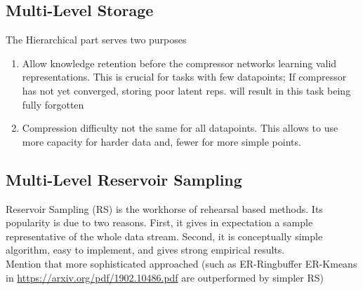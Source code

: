 \documentclass[colorinlistoftodos]{article} %
\begin{document}
    

    
    

\subsection{Multi-Level Storage}
The Hierarchical part  serves two purposes
\begin{enumerate}
    \item Allow knowledge retention before the compressor networks learning valid representations. This is crucial for tasks with few datapoints; If compressor has not yet converged, storing poor latent reps. will result in this task being fully forgotten
    \item Compression difficulty not the same for all datapoints. This allows to use more capacity for harder data and, fewer for more simple points.
\end{enumerate}

\subsection{Multi-Level Reservoir Sampling}
Reservoir Sampling (RS) is the workhorse of rehearsal based methods. Its popularity is due to two reasons. First, it gives in expectation a sample representative of the whole data stream.  Second, it is conceptually simple algorithm, easy to implement, and gives strong empirical results. \\
Mention that more sophisticated approached (such as ER-Ringbuffer ER-Kmeans in \url{https://arxiv.org/pdf/1902.10486.pdf} are outperformed by simpler RS) \\
\end{document}

